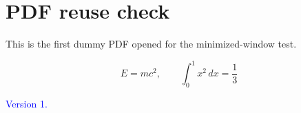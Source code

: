 \documentclass{article}
\begin{document}
\section*{PDF reuse check}
This is the first dummy PDF opened for the minimized-window test.

\[
  E = mc^2, \qquad \int_0^1 x^2\,dx = \frac13
\]

\textcolor{blue}{Version 1.}
\end{document}
